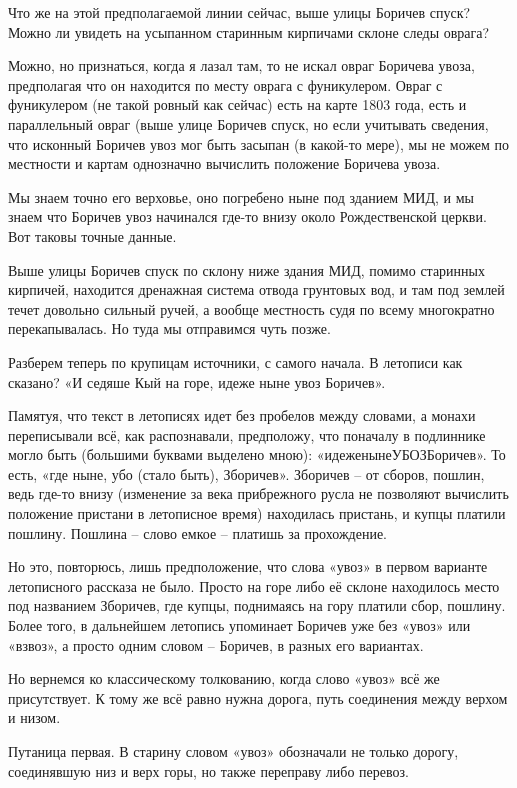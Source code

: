 Что же на этой предполагаемой линии сейчас, выше улицы Боричев спуск? Можно ли увидеть на усыпанном старинным кирпичами склоне следы оврага?

Можно, но признаться, когда я лазал там, 
то не искал овраг Боричева увоза, предполагая что он находится по месту оврага с фуникулером. Овраг с фуникулером (не такой ровный как сейчас) есть на карте 1803 года, есть и параллельный овраг (выше улице Боричев спуск, но если учитывать сведения, что исконный Боричев увоз мог быть засыпан (в какой-то мере), мы не можем по местности и картам однозначно вычислить положение Боричева увоза.

Мы знаем точно его верховье, оно погребено ныне под зданием МИД, и мы знаем что Боричев увоз начинался где-то внизу около Рождественской церкви. Вот таковы точные данные.

Выше улицы Боричев спуск по склону ниже здания МИД, помимо старинных кирпичей, находится дренажная система отвода грунтовых вод, и там под землей течет довольно сильный ручей, а вообще местность судя по всему многократно перекапывалась. Но туда мы отправимся чуть позже.

Разберем теперь по крупицам источники, с самого начала. В летописи как сказано? «И седяше Кый на горе, идеже ныне увоз Боричев».

Памятуя, что текст в летописях идет без пробелов между словами, а монахи переписывали всё, как распознавали, предположу, что поначалу в подлиннике могло быть (большими буквами выделено мною): «идеженынеУБОЗБоричев». То есть, «где ныне, убо (стало быть), Зборичев». Зборичев – от сборов, пошлин, ведь где-то внизу (изменение за века прибрежного русла не позволяют вычислить положение пристани в летописное время) находилась пристань, и купцы платили пошлину. Пошлина – слово емкое – платишь за прохождение.

Но это, повторюсь, лишь предположение, 
что слова «увоз» в первом варианте летописного рассказа не было. Просто на горе либо её склоне находилось место под названием Зборичев, где купцы, поднимаясь на гору платили сбор, пошлину. Более того, в дальнейшем летопись упоминает Боричев уже без «увоз» или «взвоз», а просто одним словом – Боричев, в разных его вариантах.

Но вернемся ко классическому толкованию, когда слово «увоз» всё же присутствует. К тому же всё равно нужна дорога, путь соединения между верхом и низом.

Путаница первая. В старину словом «увоз»
обозначали не только дорогу, соединявшую низ и верх горы, но также переправу либо перевоз. 

